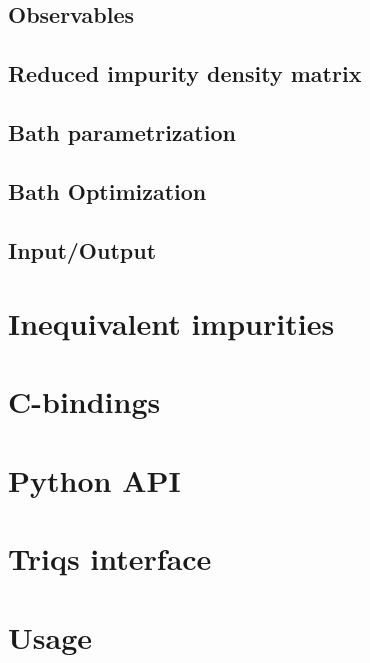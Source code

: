 \documentclass[final,3p,10pt]{elsarticle}
\begin{document}
\subsection{Observables}\label{sSecObc}

\subsection{Reduced impurity density matrix}\label{sSecRDM}

\subsection{Bath parametrization}\label{sSecBath}

\subsection{Bath Optimization}\label{sSecFit}

\subsection{Input/Output}\label{sSecIO}




\section{Inequivalent impurities}

\section{C-bindings}\label{SecCbind}

\section{Python API}

\section{Triqs interface}\label{SecEDI2Triqs}




\section{Usage}\label{SecUsage}
\end{document}
